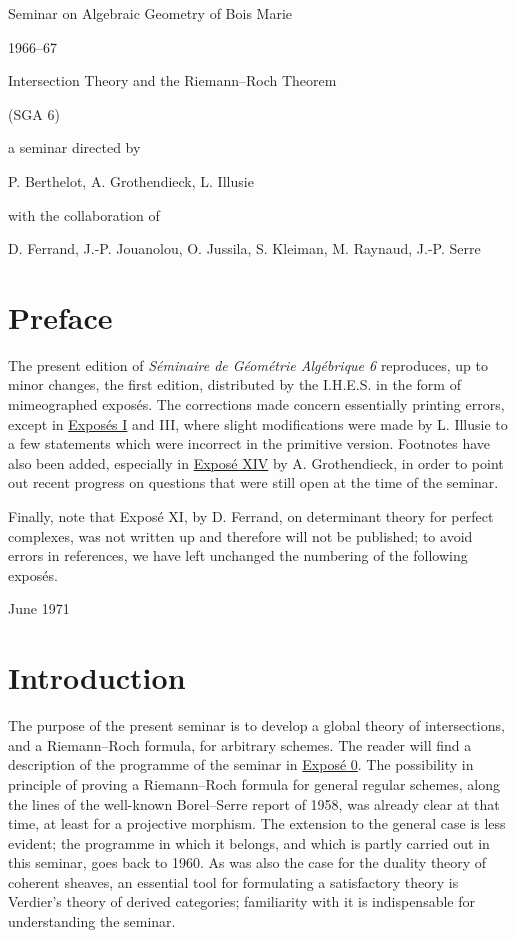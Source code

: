 \begin{center}
{\Large Seminar on Algebraic Geometry of Bois Marie}\par
{\large 1966--67}\par
\vspace{1.5em}
{\Large Intersection Theory and the Riemann--Roch Theorem}\par
{\large (SGA 6)}\par
\vspace{1.5em}
a seminar directed by\par
P. Berthelot, A. Grothendieck, L. Illusie\par
with the collaboration of\par
D. Ferrand, J.-P. Jouanolou, O. Jussila, S. Kleiman, M. Raynaud, J.-P. Serre
\end{center}

\section*{Preface}
The present edition of \emph{Séminaire de Géométrie Algébrique 6} reproduces, up to minor changes, the first edition, distributed by the I.H.E.S. in the form of mimeographed exposés. The corrections made concern essentially printing errors, except in \hyperlink{sga6.e01.expose}{Exposés I} and III, where slight modifications were made by L. Illusie to a few statements which were incorrect in the primitive version. Footnotes have also been added, especially in \hyperlink{sga6.e14.expose}{Exposé XIV} by A. Grothendieck, in order to point out recent progress on questions that were still open at the time of the seminar.

Finally, note that Exposé XI, by D. Ferrand, on determinant theory for perfect complexes, was not written up and therefore will not be published; to avoid errors in references, we have left unchanged the numbering of the following exposés.

\begin{flushright}June 1971\end{flushright}

\section*{Introduction}
The purpose of the present seminar is to develop a global theory of intersections, and a Riemann--Roch formula, for arbitrary schemes. The reader will find a description of the programme of the seminar in \hyperlink{sga6.e00.expose}{Exposé 0}. The possibility in principle of proving a Riemann--Roch formula for general regular schemes, along the lines of the well-known Borel--Serre report of 1958, was already clear at that time, at least for a projective morphism. The extension to the general case is less evident; the programme in which it belongs, and which is partly carried out in this seminar, goes back to 1960. As was also the case for the duality theory of coherent sheaves, an essential tool for formulating a satisfactory theory is Verdier's theory of derived categories; familiarity with it is indispensable for understanding the seminar.

